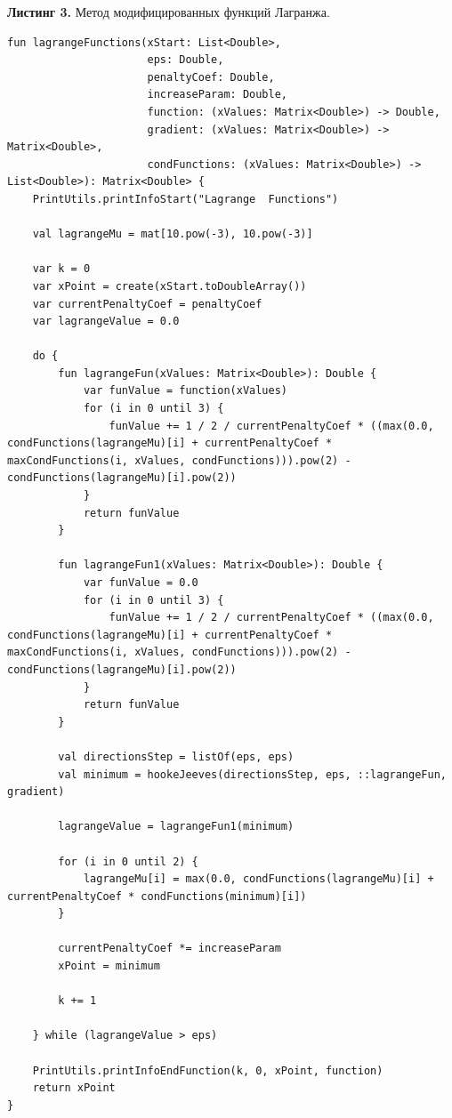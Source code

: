 \documentclass[a4paper, 12pt]{article}   	%
\begin{document}
    \textbf{Листинг 3.} Метод модифицированных функций Лагранжа.
    \begin{verbatim}
fun lagrangeFunctions(xStart: List<Double>,
                      eps: Double,
                      penaltyCoef: Double,
                      increaseParam: Double,
                      function: (xValues: Matrix<Double>) -> Double,
                      gradient: (xValues: Matrix<Double>) -> Matrix<Double>,
                      condFunctions: (xValues: Matrix<Double>) -> List<Double>): Matrix<Double> {
    PrintUtils.printInfoStart("Lagrange  Functions")

    val lagrangeMu = mat[10.pow(-3), 10.pow(-3)]

    var k = 0
    var xPoint = create(xStart.toDoubleArray())
    var currentPenaltyCoef = penaltyCoef
    var lagrangeValue = 0.0

    do {
        fun lagrangeFun(xValues: Matrix<Double>): Double {
            var funValue = function(xValues)
            for (i in 0 until 3) {
                funValue += 1 / 2 / currentPenaltyCoef * ((max(0.0, condFunctions(lagrangeMu)[i] + currentPenaltyCoef * maxCondFunctions(i, xValues, condFunctions))).pow(2) - condFunctions(lagrangeMu)[i].pow(2))
            }
            return funValue
        }

        fun lagrangeFun1(xValues: Matrix<Double>): Double {
            var funValue = 0.0
            for (i in 0 until 3) {
                funValue += 1 / 2 / currentPenaltyCoef * ((max(0.0, condFunctions(lagrangeMu)[i] + currentPenaltyCoef * maxCondFunctions(i, xValues, condFunctions))).pow(2) - condFunctions(lagrangeMu)[i].pow(2))
            }
            return funValue
        }

        val directionsStep = listOf(eps, eps)
        val minimum = hookeJeeves(directionsStep, eps, ::lagrangeFun, gradient)

        lagrangeValue = lagrangeFun1(minimum)

        for (i in 0 until 2) {
            lagrangeMu[i] = max(0.0, condFunctions(lagrangeMu)[i] + currentPenaltyCoef * condFunctions(minimum)[i])
        }

        currentPenaltyCoef *= increaseParam
        xPoint = minimum

        k += 1

    } while (lagrangeValue > eps)

    PrintUtils.printInfoEndFunction(k, 0, xPoint, function)
    return xPoint
}
\end{verbatim}
\end{document}
